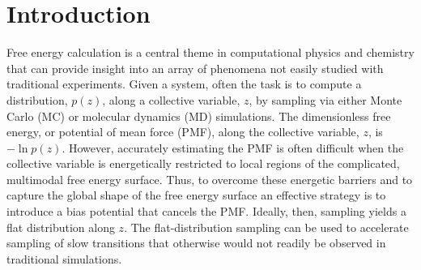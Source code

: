 \documentclass[preprint, superscriptaddress, floatfix]{revtex4-1}
\begin{document}
\maketitle



\section{Introduction}



Free energy calculation\cite{frenkel, newman} is a central theme
in computational physics and chemistry
that can provide insight into an array of phenomena not easily studied
with traditional experiments.
%
Given a system,
often the task is to compute
a distribution, $p(z)$,
along a collective variable, $z$, by sampling via either Monte Carlo\cite{
  frenkel, newman, landau_binder} (MC)
or molecular dynamics\cite{frenkel, karplus2002} (MD) simulations.
%
The dimensionless free energy, or potential of mean force (PMF),
along the collective variable, $z$,
is $-\ln p(z)$.
%
However, accurately estimating the PMF is often difficult
when the collective variable is energetically restricted to local regions
of the complicated, multimodal free energy surface.
%
Thus,
to overcome these energetic barriers and
to capture the global shape of the free energy surface
an effective strategy is to introduce a bias potential that
cancels the PMF.
%
Ideally, then, sampling yields a flat distribution
along $z$\cite{mezei1987, berg1992, *lee1993,
wang2001, wang2001pre,
huber1994,
*laio2002, *laio2008, *barducci2011, *sutto2012}.
%
The flat-distribution sampling can be used to accelerate
sampling of slow transitions that otherwise would not readily
be observed in traditional simulations.
\end{document}
